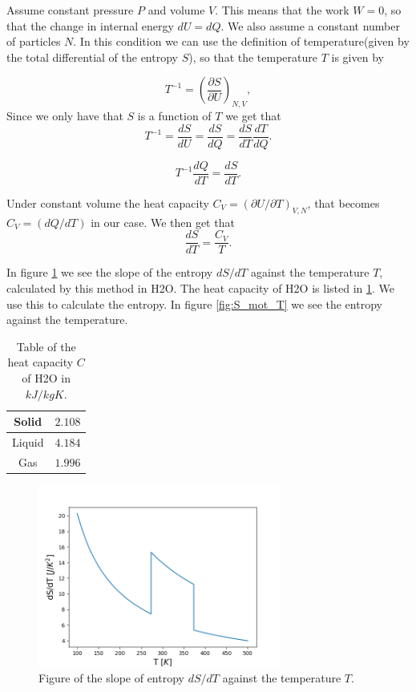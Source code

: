 \documentclass[reprint,english,notitlepage]{revtex4-1}  %
\begin{document}
Assume constant pressure $P$ and volume $V$. This means that the work $W=0$, so that the change in internal energy $dU=dQ$. We also assume a constant number of particles $N$. In this condition we can use the definition of temperature(given by the total differential of the entropy $S$), so that the temperature $T$ is given by

$$T^{-1}=(\frac{\partial S}{\partial U})_{N,V},$$
Since we only have that $S$ is a function of $T$ we get that 
$$
T^{-1}=\frac{d S}{d U}= \frac{dS}{dQ} =\frac{d S}{dT}\frac{d T}{d Q}.
$$

$$ T^{-1}\frac{dQ}{dT}=\frac{dS}{dT}.$$

Under constant volume the heat capacity $C_V=(\partial U/\partial T)_{V,N}$, that becomes $C_V=(dQ/dT)$ in our case. We then get that 
\begin{equation}\label{}
\frac{dS}{dT}=\frac{C_V}{T}.
\end{equation}


In figure \ref{fig:dSdT_mot_T} we see the slope of the entropy $dS/dT$ against the temperature $T$, calculated by this method in H2O. The heat capacity of H2O is listed in \ref{table:h2o}. We use this to calculate the entropy. In figure \ref{fig:S_mot_T} we see the entropy against the temperature.

\begin{table}[h]  %
\caption{Table of the heat capacity $C$ of H2O in $kJ/kgK$.}\label{table:h2o}
\begin{tabular}{|c|c|} %
\hline                    %
Solid & $2.108$  \\
\hline
Liquid & $4.184$ \\
\hline
Gas & $1.996$ \\
\hline
\end{tabular}
\end{table}


\begin{figure}
\centering
\includegraphics[width=8cm]{../figures/dSdT_mot_T.png}
\caption{Figure of the slope of entropy $dS/dT$ against the temperature $T$.}
\label{fig:dSdT_mot_T}
\end{figure}
\end{document}
